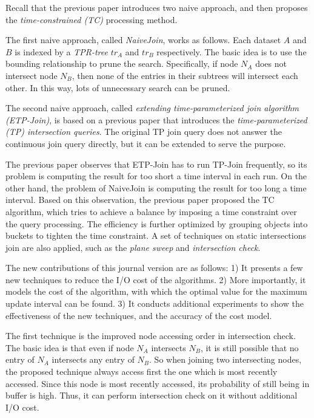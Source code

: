 \documentclass[paper=a4, fontsize=18pt]{article} %
\numberwithin{equation}{section} %
\numberwithin{figure}{section} %
\numberwithin{table}{section} %
\begin{document}
Recall that the previous paper introduces two naive approach, and then proposes the \emph{time-constrained (TC)} processing method.

The first naive approach, called \emph{NaiveJoin}, works as follows. Each dataset $A$ and $B$ is indexed by a \emph{TPR-tree} $tr_A$ and $tr_B$ respectively. The basic idea is to use the bounding relationship to prune the search. Specifically, if node $N_A$ does not intersect node $N_B$, then none of the entries in their subtrees will intersect each other. In this way, lots of unnecessary search can be pruned.

The second naive approach, called \emph{extending time-parameterized join algorithm (ETP-Join)}, is based on a previous paper \cite{TP02} that introduces the \emph{time-parameterized (TP) intersection queries}. The original TP join query does not answer the continuous join query directly, but it can be extended to serve the purpose.

The previous paper observes that ETP-Join has to run TP-Join frequently, so its problem is computing the result for too short a time interval in each run. On the other hand, the problem of NaiveJoin is computing the result for too long a time interval. Based on this observation, the previous paper proposed the TC algorithm, which tries to achieve a balance by imposing a time constraint over the query processing. The efficiency is further optimized by grouping objects into buckets to tighten the time constraint. A set of techniques on static intersections join are also applied, such as the \emph{plane sweep} and \emph{intersection check}.

The new contributions of this journal version are as follows: 1) It presents a few new techniques to reduce the I/O cost of the algorithms. 2) More importantly, it models the cost of the algorithm, with which the optimal value for the maximum update interval can be found. 3) It conducts additional experiments to show the effectiveness of the new techniques, and the accuracy of the cost model.

The first technique is the improved node accessing order in intersection check. The basic idea is that even if node $N_A$ intersects $N_B$, it is still possible that no entry of $N_A$ intersects any entry of $N_B$. So when joining two intersecting nodes, the proposed technique always access first the one which is most recently accessed. Since this node is most recently accessed, its probability of still being in buffer is high. Thus, it can perform intersection check on it without additional I/O cost.
\end{document}
